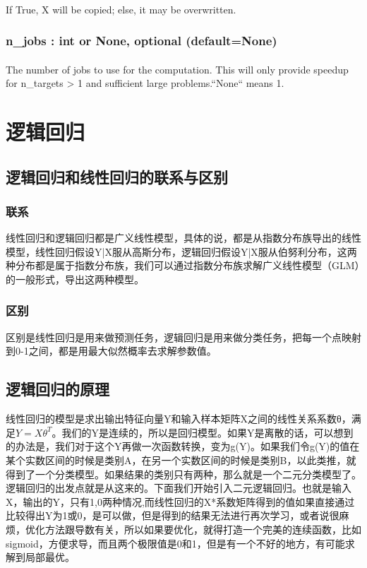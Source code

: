 \documentclass[18pt,a4paper,oneside,UTF8]{ctexart}
\begin{document}
\paragraph{}If True, X will be copied; else, it may be overwritten.
\subsubsection{n\_jobs : int or None, optional (default=None)}
\paragraph{}The number of jobs to use for the computation. This will only provide
speedup for n\_targets > 1 and sufficient large problems.``None`` means 1.
\section{逻辑回归}
\subsection{逻辑回归和线性回归的联系与区别}
\subsubsection{联系}
线性回归和逻辑回归都是广义线性模型，具体的说，都是从指数分布族导出的线性模型，线性回归假设Y|X服从高斯分布，逻辑回归假设Y|X服从伯努利分布，这两种分布都是属于指数分布族，我们可以通过指数分布族求解广义线性模型（GLM）的一般形式，导出这两种模型。
\subsubsection{区别}
区别是线性回归是用来做预测任务，逻辑回归是用来做分类任务，把每一个点映射到0-1之间，都是用最大似然概率去求解参数值。
\subsection{逻辑回归的原理}
线性回归的模型是求出输出特征向量Y和输入样本矩阵X之间的线性关系系数θ，满足$Y=X\theta^T$。我们的Y是连续的，所以是回归模型。如果Y是离散的话，可以想到的办法是，我们对于这个Y再做一次函数转换，变为g(Y)。如果我们令g(Y)的值在某个实数区间的时候是类别A，在另一个实数区间的时候是类别B，以此类推，就得到了一个分类模型。如果结果的类别只有两种，那么就是一个二元分类模型了。逻辑回归的出发点就是从这来的。下面我们开始引入二元逻辑回归。也就是输入X，输出的Y，只有1,0两种情况,而线性回归的X*系数矩阵得到的值如果直接通过比较得出Y为1或0，是可以做，但是得到的结果无法进行再次学习，或者说很麻烦，优化方法跟导数有关，所以如果要优化，就得打造一个完美的连续函数，比如sigmoid，方便求导，而且两个极限值是0和1，但是有一个不好的地方，有可能求解到局部最优。
\end{document}
